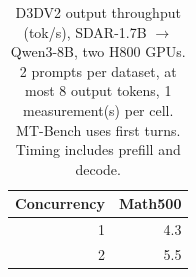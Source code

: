 \begin{table}[t]
\centering
\caption{D3DV2 output throughput (tok/s), SDAR-1.7B $\rightarrow$ Qwen3-8B, two H800 GPUs. 2 prompts per dataset, at most 8 output tokens, 1 measurement(s) per cell. MT-Bench uses first turns. Timing includes prefill and decode.}
\label{tab:d3dv2-concurrency}
\begin{tabular}{rr}
\hline
Concurrency & Math500 \\
\hline
1 & 4.3 \\
2 & 5.5 \\
\hline
\end{tabular}
\end{table}
